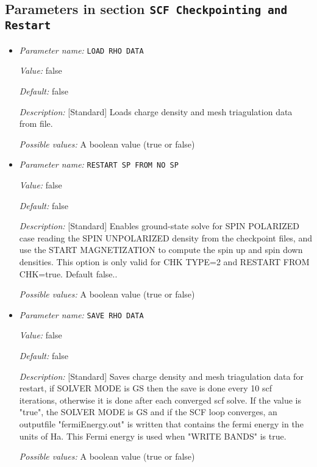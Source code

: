 \subsection{Parameters in section \tt SCF Checkpointing and Restart}
\label{parameters:SCF_20Checkpointing_20and_20Restart}

\begin{itemize}
\item {\it Parameter name:} {\tt LOAD RHO DATA}
\label{parameters:SCF Checkpointing and Restart/LOAD RHO DATA}
\label{parameters:SCF_20Checkpointing_20and_20Restart/LOAD_20RHO_20DATA}


{\it Value:} false


{\it Default:} false


{\it Description:} [Standard] Loads charge density and mesh triagulation data from file.


{\it Possible values:} A boolean value (true or false)
\item {\it Parameter name:} {\tt RESTART SP FROM NO SP}
\label{parameters:SCF Checkpointing and Restart/RESTART SP FROM NO SP}
\label{parameters:SCF_20Checkpointing_20and_20Restart/RESTART_20SP_20FROM_20NO_20SP}


{\it Value:} false


{\it Default:} false


{\it Description:} [Standard] Enables ground-state solve for SPIN POLARIZED case reading the SPIN UNPOLARIZED density from the checkpoint files, and use the START MAGNETIZATION to compute the spin up and spin down densities. This option is only valid for CHK TYPE=2 and RESTART FROM CHK=true. Default false..


{\it Possible values:} A boolean value (true or false)
\item {\it Parameter name:} {\tt SAVE RHO DATA}
\label{parameters:SCF Checkpointing and Restart/SAVE RHO DATA}
\label{parameters:SCF_20Checkpointing_20and_20Restart/SAVE_20RHO_20DATA}


{\it Value:} false


{\it Default:} false


{\it Description:} [Standard] Saves charge density and mesh triagulation data for restart, if SOLVER MODE is GS then the save is done every 10 scf iterations, otherwise it is done after each converged scf solve. If the value is "true", the SOLVER MODE is GS and if the SCF loop converges, an outputfile "fermiEnergy.out" is written that contains the fermi energy in the units of Ha. This Fermi energy is used when "WRITE BANDS" is true.


{\it Possible values:} A boolean value (true or false)
\end{itemize}

